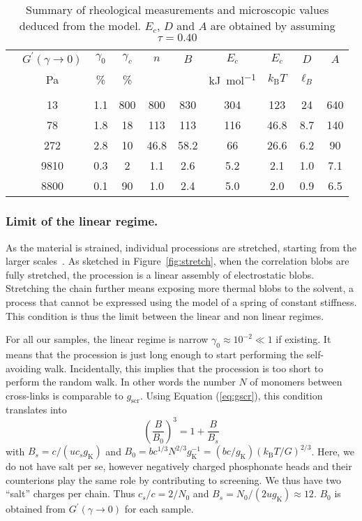 \documentclass[twoside,twocolumn,9pt]{article}
\begin{document}
\begin{table*}
\centering
\begin{tabular}{@{}lSSSSSSSSS@{}}\hline
& {$G^\prime(\gamma\rightarrow 0)$} & {$\gamma_0$} & {$\gamma_c$} & {$n$} & {$B$} & {$E_c$} & {$E_c$} & {$D$} & {$A$}\\
&	{\si{\pascal}} & {\%} & {\%} & & & {\si{\kilo\joule\per\mole}}& {$k_\mathrm{B}T$} & {$\ell_B$}&\\\hline&&&&&\\[-10pt]
	&	13	&	1.1	&	800	&	800	&	830	&	304	&	123	&	24	&	640\\
	&	78	&	1.8	&	18	&	113	&	113	&	116	&	46.8	&	8.7	&	140\\
	&	272	&	2.8	&	10	&	46.8	&	58.2	&	66	&	26.6	&	6.2	&	90\\
	&	9810	&	0.3	&	2	&	1.1	&	2.6	&	5.2	&	2.1	&	1.0	&	7.1\\
	&	8800	&	0.1	&	90	&	1.0	&	2.4	&	5.0	&	2.0	&	0.9	&	6.5\\
\hline
\end{tabular}
\caption{Summary of rheological measurements and microscopic values deduced from the model. $E_c$, $D$ and $A$ are obtained by assuming $\tau=0.40$}
\label{tab:results}
\end{table*}

\subsubsection{Limit of the linear regime.}

As the material is strained, individual processions are stretched, starting from the larger scales~\cite{Pincus1976}. As sketched in Figure~\ref{fig:stretch}, when the correlation blobs are fully stretched, the procession is a linear assembly of electrostatic blobs. Stretching the chain further means exposing more thermal blobs to the solvent, a process that cannot be expressed using the model of a spring of constant stiffness. This condition is thus the limit between the linear and non linear regimes.

For all our samples, the linear regime is narrow $\gamma_0\approx 10^{-2}\ll 1$ if existing. It means that the procession is just long enough to start performing the self-avoiding walk. Incidentally, this implies that the procession is too short to perform the random walk. In other words the number $N$ of monomers between cross-links is comparable to $g_\mathrm{scr}$. Using Equation (\ref{eq:gscr}), this condition translates into
\begin{equation}
\left(\frac{B}{B_0}\right)^3 = 1 + \frac{B}{B_s}
\label{eq:solveB}
\end{equation}
with $B_s = c/(u c_s g_\mathrm{K})$ and $B_0 = b c^{1/3} N^{2/3} g_\mathrm{K}^{-1} = (bc/g_\mathrm{K}) \left(k_\mathrm{B}T/G\right)^{2/3}$. Here, we do not have salt per se, however negatively charged phosphonate heads and their counterions play the same role by contributing to screening. We thus have two ``salt'' charges per chain. Thus $c_s/c = 2/N_0$ and $B_s = N_0/(2u g_\mathrm{K}) \approx 12$. $B_0$ is obtained from $G^\prime(\gamma\rightarrow 0)$ for each sample.
\end{document}
